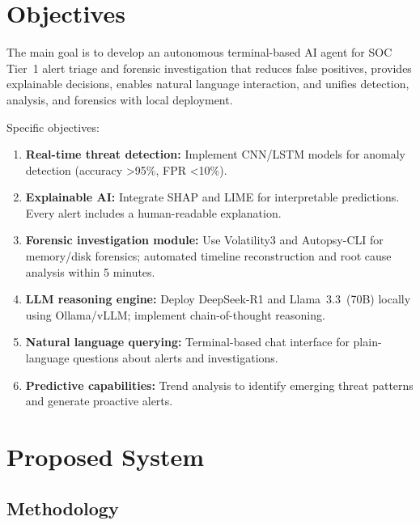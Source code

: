 \documentclass[12pt,a4paper]{report}
\begin{document}
\chapter{Objectives}

The main goal is to develop an autonomous terminal-based AI agent for SOC Tier~1 alert triage and forensic investigation that reduces false positives, provides explainable decisions, enables natural language interaction, and unifies detection, analysis, and forensics with local deployment.

Specific objectives:

\begin{enumerate}
    \item \textbf{Real-time threat detection:} Implement CNN/LSTM models for anomaly detection (accuracy >95\%, FPR <10\%).
    \item \textbf{Explainable AI:} Integrate SHAP and LIME for interpretable predictions. Every alert includes a human-readable explanation.
    \item \textbf{Forensic investigation module:} Use Volatility3 and Autopsy-CLI for memory/disk forensics; automated timeline reconstruction and root cause analysis within 5 minutes.
    \item \textbf{LLM reasoning engine:} Deploy DeepSeek-R1 and Llama~3.3~(70B) locally using Ollama/vLLM; implement chain-of-thought reasoning.
    \item \textbf{Natural language querying:} Terminal-based chat interface for plain-language questions about alerts and investigations.
    \item \textbf{Predictive capabilities:} Trend analysis to identify emerging threat patterns and generate proactive alerts.
\end{enumerate}

\chapter{Proposed System}

\section{Methodology}
\end{document}
